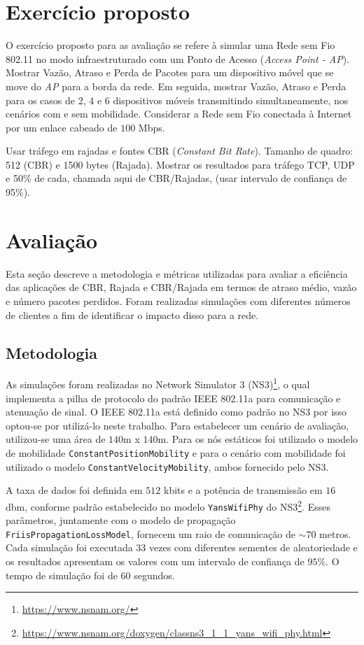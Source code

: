 \documentclass[12pt]{article}
\begin{document}
\section{Exercício proposto}
\label{exercicio}

O exercício proposto para as avaliação se refere à simular uma Rede sem Fio 802.11 no modo infraestruturado com um Ponto de Acesso (\textit{Access Point - AP}). Mostrar Vazão, Atraso e Perda de Pacotes para um dispositivo móvel que se move do \textit{AP} para a borda da rede. Em seguida, mostrar Vazão, Atraso e Perda  para os casos de $2$, $4$ e $6$ dispositivos móveis transmitindo simultaneamente, nos cenários com e sem mobilidade. Considerar a Rede sem Fio conectada à Internet por um enlace cabeado de $100$ Mbps.

Usar tráfego em rajadas e fontes CBR (\textit{Constant Bit Rate}). Tamanho de quadro: 512 (CBR) e 1500 bytes (Rajada). Mostrar os resultados para tráfego TCP, UDP e 50\% de cada, chamada aqui de CBR/Rajadas, (usar intervalo de confiança de 95\%).

\section{Avaliação}
\label{avaliacao}

Esta seção descreve a metodologia e métricas utilizadas para avaliar a eficiência das aplicações de CBR, Rajada e CBR/Rajada em termos de atraso médio, vazão e número pacotes perdidos. Foram realizadas simulações com diferentes números de clientes a fim de identificar o impacto disso para a rede.

\subsection{Metodologia}
\label{subsec:metodologia}

As simulações foram realizadas no Network Simulator 3 (NS3)\footnote{\url{https://www.nsnam.org/}}, o qual implementa a pilha de protocolo do padrão IEEE 802.11a para comunicação e atenuação de sinal. O IEEE 802.11a está definido como padrão no NS3 por isso optou-se por utilizá-lo neste trabalho. Para estabelecer um cenário de avaliação, utilizou-se uma área de $140$m x $140$m. Para os nós estáticos foi utilizado o modelo de mobilidade \texttt{ConstantPositionMobility} e para o cenário com mobilidade foi utilizado o modelo \texttt{ConstantVelocityMobility}, ambos fornecido pelo NS3.

A taxa de dados foi definida em $512$ kbits e a potência de transmissão em $16$ dbm, conforme padrão estabelecido no modelo \texttt{YansWifiPhy} do NS3\footnote{\url{https://www.nsnam.org/doxygen/classns3_1_1_yans_wifi_phy.html}}. Esses parâmetros, juntamente com o modelo de propagação \texttt{FriisPropagationLossModel}, fornecem um raio de comunicação de $\sim70$ metros. Cada simulação foi executada $33$ vezes com diferentes sementes de aleatoriedade e os resultados apresentam os valores com um intervalo de confiança de $95$\%. O tempo de simulação foi de $60$ segundos.
\end{document}
